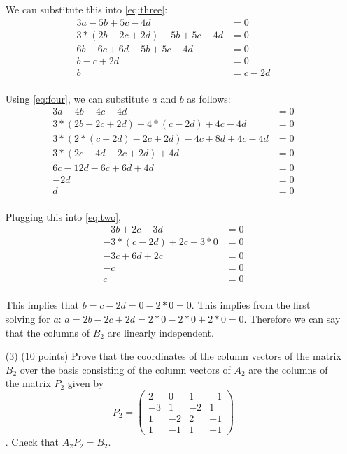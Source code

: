 \documentclass[12pt]{article}
\begin{document}
\begin{itemize}
We can substitute this into \eqref{eq:three}:
\begin{align*}
    3a - 5b + 5c - 4d &= 0 \\
    3 * (2b - 2c + 2d) - 5b + 5c - 4d &= 0 \\
    6b - 6c + 6d - 5b + 5c - 4d &= 0 \\
    b - c + 2d &= 0 \\
    b &= c - 2d \\
\end{align*}

Using \eqref{eq:four}, we can substitute $a$ and $b$ as follows: 
\begin{align*}
    3a - 4b + 4c - 4d &= 0 \\
    3 * (2b - 2c + 2d) - 4 * (c - 2d) + 4c - 4d &= 0 \\
    3 *(2 * (c - 2d) - 2c + 2d) - 4c + 8d + 4c - 4d &= 0 \\
    3 * (2c - 4d - 2c + 2d) + 4d &= 0 \\
    6c - 12d - 6c + 6d + 4d &= 0 \\
    -2d &= 0 \\
    d &= 0 \\
\end{align*}

Plugging this into \eqref{eq:two}, 
\begin{align*}
    -3b + 2c - 3d &= 0 \\
    -3 * (c - 2d) + 2c - 3 * 0 &= 0 \\
    -3c + 6d + 2c &= 0 \\
    -c &= 0 \\
    c &= 0 \\
\end{align*}

This implies that $b = c - 2d = 0 - 2 * 0 = 0$. This implies from the first solving for $a$: $a = 2b - 2c + 2d = 2 * 0 - 2 * 0 + 2 * 0 = 0$. Therefore we can say that the columns of $B_2$ are linearly independent.

\item[(3)](10 points)
Prove that the coordinates of the column vectors of the matrix $B_2$
over the basis consisting of the column vectors of $A_2$ 
are the columns of the matrix $P_2$ given by
\[
P_2 = 
\begin{pmatrix}
2 & 0 & 1 & -1\\
-3 & 1 & -2 & 1 \\
1 & -2 & 2 & -1 \\
1 & -1 & 1 & -1
\end{pmatrix}
\].
Check that $A_2P_2 = B_2$. 


\end{itemize}
\end{document}
